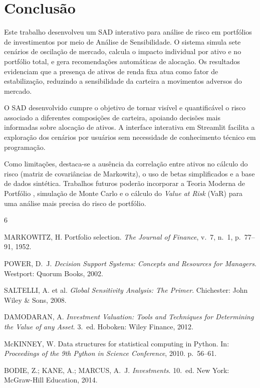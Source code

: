 \documentclass[12pt]{article}
\begin{document}
\section{Conclusão}

Este trabalho desenvolveu um SAD interativo para análise de risco em portfólios de
investimentos por meio de Análise de Sensibilidade. O sistema simula sete cenários de
oscilação de mercado, calcula o impacto individual por ativo e no portfólio total, e
gera recomendações automáticas de alocação. Os resultados evidenciam que a presença de
ativos de renda fixa atua como fator de estabilização, reduzindo a sensibilidade da
carteira a movimentos adversos do mercado.

O SAD desenvolvido cumpre o objetivo de tornar visível e quantificável o risco
associado a diferentes composições de carteira, apoiando decisões mais informadas sobre
alocação de ativos. A interface interativa em Streamlit facilita a exploração dos
cenários por usuários sem necessidade de conhecimento técnico em programação.

Como limitações, destaca-se a ausência da correlação entre ativos no cálculo do risco
(matriz de covariâncias de Markowitz), o uso de betas simplificados e a base de dados
sintética. Trabalhos futuros poderão incorporar a Teoria Moderna de Portfólio
\cite{markowitz1952}, simulação de Monte Carlo e o cálculo do \textit{Value at Risk}
(VaR) para uma análise mais precisa do risco de portfólio.

\begin{thebibliography}{6}

MARKOWITZ, H.
Portfolio selection.
\textit{The Journal of Finance}, v.~7, n.~1, p.~77--91, 1952.

POWER, D.~J.
\textit{Decision Support Systems: Concepts and Resources for Managers}.
Westport: Quorum Books, 2002.

SALTELLI, A. et al.
\textit{Global Sensitivity Analysis: The Primer}.
Chichester: John Wiley \& Sons, 2008.

DAMODARAN, A.
\textit{Investment Valuation: Tools and Techniques for Determining the Value of
any Asset}. 3.~ed. Hoboken: Wiley Finance, 2012.

McKINNEY, W.
Data structures for statistical computing in Python.
In: \textit{Proceedings of the 9th Python in Science Conference}, 2010.
p.~56--61.

BODIE, Z.; KANE, A.; MARCUS, A.~J.
\textit{Investments}. 10.~ed. New York: McGraw-Hill Education, 2014.

\end{thebibliography}
\end{document}
